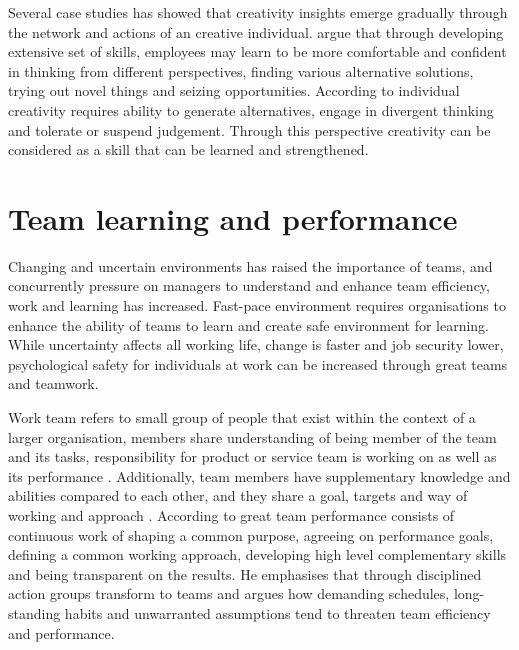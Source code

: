 Several case studies has showed that creativity insights emerge gradually through the network and actions of an creative individual. \citet{shalley2004leaders} argue that through developing extensive set of skills, employees may learn to be more comfortable and confident in thinking from different perspectives, finding various alternative solutions, trying out novel things and seizing opportunities. According to \citet{hennessey19881} individual creativity requires ability to generate alternatives, engage in divergent thinking and tolerate or suspend judgement. Through this perspective creativity can be considered as a skill that can be learned and strengthened. 

\section{Team learning and performance}
Changing and uncertain environments has raised the importance of teams, and concurrently pressure on managers to understand and enhance team efficiency, work and learning has increased. Fast-pace environment requires organisations to enhance the ability of teams to learn and create safe environment for learning. While uncertainty affects all working life, change is faster and job security lower, psychological safety for individuals at work can be increased through great teams and teamwork. \citep{edmondson1999psychological}

Work team refers to small group of people that exist within the context of a larger organisation, members share understanding of being member of the team and its tasks, responsibility for product or service team is working on \citep{hackman1987design,alderfer1983intergroup} as well as its performance \citep{edmondson1999psychological}. Additionally, team members have supplementary knowledge and abilities compared to each other, and they share a goal, targets and way of working and approach \citep{edmondson1999psychological}. According to \citet{katzenbach1993wisdom} great team performance consists of continuous work of shaping a common purpose, agreeing on performance goals, defining a common working approach, developing high level complementary skills and being transparent on the results. He emphasises that through disciplined action groups transform to teams and argues how demanding schedules, long-standing habits and unwarranted assumptions tend to threaten team efficiency and performance.


